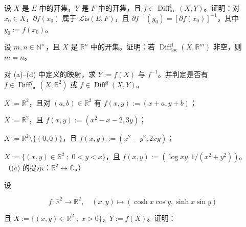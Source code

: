 \begin{exercises}
\item

设 $ X $ 是 $ E $ 中的开集，$ Y $ 是 $ F $ 中的开集，且 $ f \in \operatorname{Diff}^{1}_{\mathrm{loc}}(X,Y) $。证明：对 $ x_0 \in X $，$ \partial f(x_0) $ 属于 $ \mathcal{L}\mathrm{is}(E,F) $，且 $ \partial f^{-1}(y_0) = [\partial f(x_0)]^{-1} $，其中 $ y_0 := f(x_0) $。

\item

设 $ m,n \in \mathbb{N}^{\times} $，且 $ X $ 是 $ \mathbb{R}^n $ 中的开集。证明：若 $ \operatorname{Diff}^{1}_{\mathrm{loc}}(X,\mathbb{R}^m) $ 非空，则 $ m = n $。

\item

对 (a)–(d) 中定义的映射，求 $ Y := f(X) $ 与 $ f^{-1} $。并判定是否有 $ f \in \operatorname{Diff}^{q}_{\mathrm{loc}}(X,\mathbb{R}^2) $ 或 $ f \in \operatorname{Diff}^{q}(X,Y) $。

\begin{items}
\item

$ X := \mathbb{R}^2 $，且对 $ (a,b) \in \mathbb{R}^2 $ 有 $ f(x,y) := (x + a, y + b) $；

\item

$ X := \mathbb{R}^2 $，且 $ f(x,y) := (x^2 - x - 2, 3y) $；

\item

$ X := \mathbb{R}^2 \setminus \{(0,0)\} $，且 $ f(x,y) := (x^2 - y^2, 2xy) $；

\item

$ X := \{(x,y) \in \mathbb{R}^2 \; ; \; 0 < y < x\} $，且 $ f(x,y) := (\log xy, 1/(x^2 + y^2)) $。
（(c) 的提示：$ \mathbb{R}^2 \leftrightarrow \mathbb{C} $。）

\end{items}

\item

设

\[
f: \mathbb{R}^2 \to \mathbb{R}^2 , \quad (x,y) \mapsto (\cosh x \cos y, \sinh x \sin y)
\]

且 $ X := \{(x,y) \in \mathbb{R}^2 \; ; \; x > 0\} $，$ Y := f(X) $。证明：

\begin{items}
\item


\end{items}
\end{exercises}
